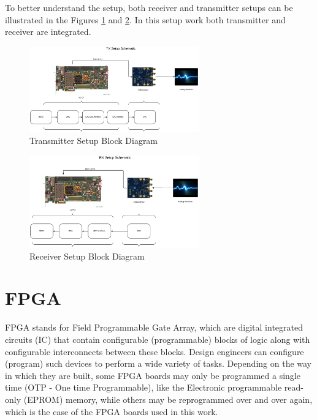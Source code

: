 To better understand the setup, both receiver and transmitter setups can be
illustrated in the Figures \ref{fig:txsetup} and \ref{fig:rxsetup}. In this
setup work both transmitter and receiver are integrated.


\begin{figure}[htbp]
    \centering
    \includegraphics[width=0.65\textwidth]{./figures/tx_setup}
    \caption{ Transmitter Setup Block Diagram
    \label{fig:txsetup}}
\end{figure}

\begin{figure}[htbp]
    \centering
    \includegraphics[width=0.65\textwidth]{./figures/rx_setup}
    \caption{ Receiver Setup Block Diagram
    \label{fig:rxsetup}}
\end{figure}

\section{FPGA}

FPGA stands for Field Programmable Gate Array, which are digital integrated
circuits (IC) that contain configurable (programmable) blocks of logic along
with configurable interconnects between these blocks. Design engineers can
configure (program) such devices to perform a wide variety of tasks. Depending
on the way in which they are built, some FPGA boards may only be programmed a
single time (OTP - One time Programmable), like the Electronic programmable
read-only (EPROM) memory, while others may be reprogrammed over and over again,
which is the case of the FPGA boards used in this work.\cite{max2004}

